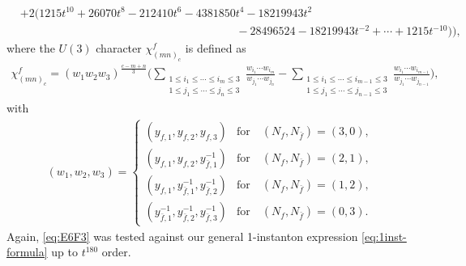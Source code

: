 \documentclass[letterpaper, 11pt]{article}
\newcommand{\nn}{\nonumber}
\begin{document}
{\begin{align}
&+2(1215 t^{10}+26070 t^8-212410 t^6-4381850 t^4-18219943 t^2\nn\\
&\hspace{8cm}-28496524-18219943 t^{-2}+\cdots+1215t^{-10})\Big),\nn
\end{align}
where the $U(3)$ character $\chi^f_{(mn)_c}$ is defined as
  \begin{align}
    \chi^f_{(mn)_c} =
      (w_1 w_2w_3)^{\frac{c-m+n}{3}}\bigg( \sum_{\substack{1\leq i_1\leq\cdots\leq i_m\leq3\\1\leq j_1\leq\cdots\leq j_n\leq 3}}\frac{w_{i_1}\cdots w_{i_m}}{w_{j_1}\cdots w_{j_n}}-\sum_{\substack{1\leq i_1\leq\cdots\leq i_{m-1}\leq3\\1\leq j_1\leq\cdots\leq j_{n-1}\leq 3}}\frac{w_{i_1}\cdots w_{i_{m-1}}}{w_{j_1}\cdots w_{j_{n-1}}}\bigg),
  \end{align}
  with
  \begin{align}
  (w_1,w_2,w_3)=
  \begin{cases}
  (y_{f,1},y_{f,2},y_{f,3}) & \text{for}\quad (N_f, N_{\bar{f}})=(3,0),\\
  (y_{f,1},y_{f,2},y_{\bar{f},1}^{-1}) & \text{for}\quad (N_f, N_{\bar{f}})=(2,1),\\
  (y_{f,1},y_{\bar{f},1}^{-1},y_{\bar{f},2}^{-1}) & \text{for}\quad (N_f, N_{\bar{f}})=(1,2),\\
  (y_{\bar{f},1}^{-1},y_{\bar{f},2}^{-1},y_{\bar{f},3}^{-1}) & \text{for}\quad (N_f, N_{\bar{f}})=(0,3).
  \end{cases}
  \end{align}
  Again, \eqref{eq:E6F3} was tested against our general 1-instanton expression \eqref{eq:1inst-formula} up to $t^{180}$ order.

  

}
\end{document}
